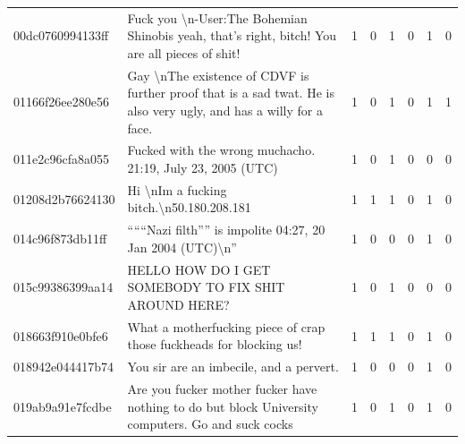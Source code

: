\begin{table}[htb]
{\begin{minipage}{\textheight}
\begin{threeparttable}
\begin{tabularx}{\textwidth}{L{0.8} L{6.6} C{0.1} C{0.1} C{0.1} C{0.1} C{0.1} C{0.1}}
                    00dc0760994133ff & Fuck you \textbackslash n-User:The Bohemian Shinobis yeah, that's right, bitch! You are all pieces of shit!                      & 1           & 0           & 1           & 0           & 1           & 0           \\
                    01166f26ee280e56 & Gay \textbackslash nThe existence of CDVF is further proof that is a sad twat. He is also very ugly, and has a willy for a face. & 1           & 0           & 1           & 0           & 1           & 1           \\
                    011e2c96cfa8a055 & Fucked with the wrong muchacho. 21:19, July 23, 2005 (UTC)                                                                       & 1           & 0           & 1           & 0           & 0           & 0           \\
                    01208d2b76624130 & Hi \textbackslash nIm a fucking bitch.\textbackslash n50.180.208.181                                                             & 1           & 1           & 1           & 0           & 1           & 0           \\
                    014c96f873db11ff & ``````Nazi filth'''' is impolite 04:27, 20 Jan 2004 (UTC)\textbackslash n''                                                      & 1           & 0           & 0           & 0           & 1           & 0           \\
                    015c99386399aa14 & HELLO HOW DO I GET SOMEBODY TO FIX SHIT AROUND HERE?                                                                             & 1           & 0           & 1           & 0           & 0           & 0           \\
                    018663f910e0bfe6 & What a motherfucking piece of crap those fuckheads for blocking us!                                                              & 1           & 1           & 1           & 0           & 1           & 0           \\
                    018942e044417b74 & You sir are an imbecile, and a pervert.                                                                                          & 1           & 0           & 0           & 0           & 1           & 0           \\
                    019ab9a91e7fcdbe & Are you fucker mother fucker have nothing to do but block University computers. Go and suck cocks                                & 1           & 0           & 1           & 0           & 1           & 0           \\

\end{tabularx}
\end{threeparttable}
\end{minipage}}
\end{table}
